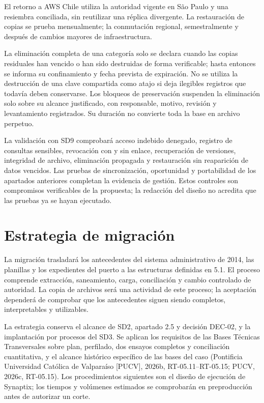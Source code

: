 El retorno a AWS Chile utiliza la autoridad vigente en São Paulo y una resiembra conciliada, sin reutilizar una réplica divergente. La restauración de copias se prueba mensualmente; la conmutación regional, semestralmente y después de cambios mayores de infraestructura.

La eliminación completa de una categoría solo se declara cuando las copias residuales han vencido o han sido destruidas de forma verificable; hasta entonces se informa su confinamiento y fecha prevista de expiración. No se utiliza la destrucción de una clave compartida como atajo si deja ilegibles registros que todavía deben conservarse. Los bloqueos de preservación suspenden la eliminación solo sobre su alcance justificado, con responsable, motivo, revisión y levantamiento registrados. Su duración no convierte toda la base en archivo perpetuo.

La validación con SD9 comprobará acceso indebido denegado, registro de consultas sensibles, revocación con y sin enlace, recuperación de versiones, integridad de archivo, eliminación propagada y restauración sin reaparición de datos vencidos. Las pruebas de sincronización, oportunidad y portabilidad de los apartados anteriores completan la evidencia de gestión. Estos controles son compromisos verificables de la propuesta; la redacción del diseño no acredita que las pruebas ya se hayan ejecutado.

\newpage
\section{Estrategia de migración} %
La migración trasladará los antecedentes del sistema administrativo de 2014, las planillas y los expedientes del puerto a las estructuras definidas en 5.1. El proceso comprende extracción, saneamiento, carga, conciliación y cambio controlado de autoridad. La copia de archivos será una actividad de este proceso; la aceptación dependerá de comprobar que los antecedentes siguen siendo completos, interpretables y utilizables.

La estrategia conserva el alcance de SD2, apartado 2.5 y decisión DEC-02, y la implantación por procesos del SD3. Se aplican los requisitos de las Bases Técnicas Transversales sobre plan, perfilado, dos ensayos completos y conciliación cuantitativa, y el alcance histórico específico de las bases del caso (Pontificia Universidad Católica de Valparaíso [PUCV], 2026b, RT-05.11--RT-05.15; PUCV, 2026c, RT-05.15). Los procedimientos siguientes son el diseño de ejecución de Synaptix; los tiempos y volúmenes estimados se comprobarán en preproducción antes de autorizar un corte.

